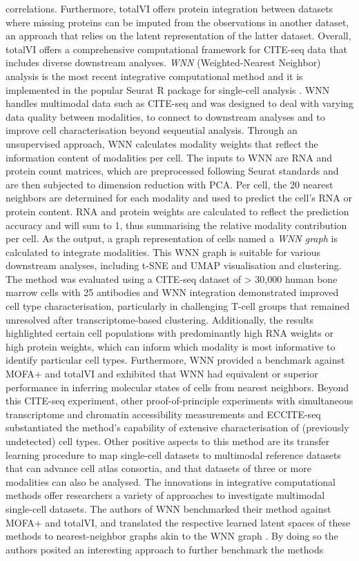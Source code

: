 \documentclass[times, twoside, watermark]{zHenriquesLab-StyleBioRxiv}
\begin{document}
correlations. Furthermore, totalVI offers protein integration between datasets where missing proteins can be imputed from the observations in another dataset, an approach that relies on the latent representation of the latter dataset. Overall, totalVI offers a comprehensive computational framework for CITE-seq data that includes diverse downstream analyses. \newline \textit{WNN} (Weighted-Nearest Neighbor) analysis is the most recent integrative computational method and it is implemented in the popular Seurat R package for single-cell analysis \cite{Hao2021}. WNN handles multimodal data such as CITE-seq and was designed to deal with varying data quality between modalities, to connect to downstream analyses and to improve cell characterisation beyond sequential analysis. Through an unsupervised approach, WNN calculates modality weights that reflect the information content of modalities per cell. The inputs to WNN are RNA and protein count matrices, which are preprocessed following Seurat standards and are then subjected to dimension reduction with PCA. Per cell, the 20 nearest neighbors are determined for each modality and used to predict the cell's RNA or protein content. RNA and protein weights are calculated to reflect the prediction accuracy and will sum to 1, thus summarising the relative modality contribution per cell. As the output, a graph representation of cells named a \textit{WNN graph} is calculated to integrate modalities. This WNN graph is suitable for various downstream analyses, including t-SNE and UMAP visualisation and clustering. The method was evaluated using a CITE-seq dataset of > 30,000 human bone marrow cells with 25 antibodies and WNN integration demonstrated improved cell type characterisation, particularly in challenging T-cell groups that remained unresolved after transcriptome-based clustering. Additionally, the results highlighted certain cell populations with predominantly high RNA weights or high protein weights, which can inform which modality is most informative to identify particular cell types. Furthermore, WNN provided a benchmark against MOFA+ and totalVI and exhibited that WNN had equivalent or superior performance in inferring molecular states of cells from nearest neighbors. Beyond this CITE-seq experiment, other proof-of-principle experiments with simultaneous transcriptome and chromatin accessibility measurements and ECCITE-seq substantiated the method's capability of extensive characterisation of (previously undetected) cell types. Other positive aspects to this method are its transfer learning procedure to map single-cell datasets to multimodal reference datasets that can advance cell atlas consortia, and that datasets of three or more modalities can also be analysed. \newline The innovations in integrative computational methods offer researchers a variety of approaches to investigate multimodal single-cell datasets. The authors of WNN benchmarked their method against MOFA+ and totalVI, and translated the respective learned latent spaces of these methods to nearest-neighbor graphs akin to the WNN graph \cite{Hao2021}. By doing so the authors posited an interesting approach to further benchmark the methods 
\end{document}
